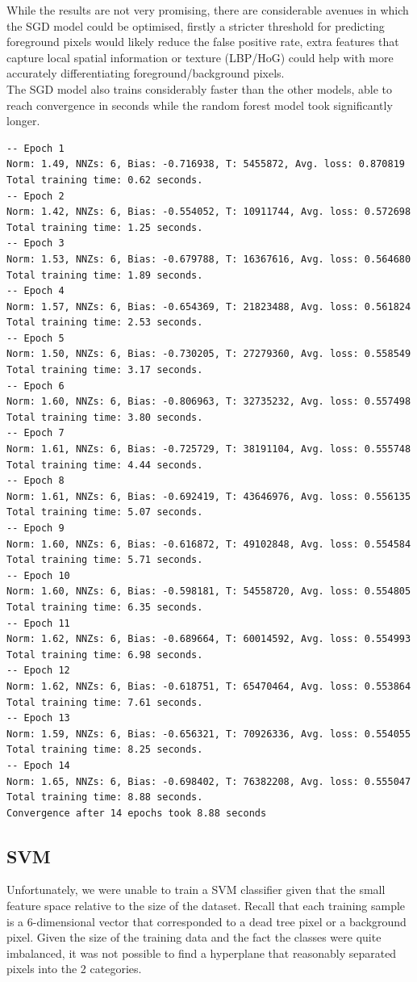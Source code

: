 While the results are not very promising, there are considerable avenues in which the SGD model could be optimised, firstly a stricter threshold for predicting foreground pixels would likely reduce the false positive rate, extra features that capture local spatial information or texture (LBP/HoG) could help with more accurately differentiating foreground/background pixels.\\
The SGD model also trains considerably faster than the other models, able to reach convergence in seconds while the random forest model took significantly longer.
\begin{lstlisting}[caption={SGD Training}, label={fig:sgd-train}]
-- Epoch 1
Norm: 1.49, NNZs: 6, Bias: -0.716938, T: 5455872, Avg. loss: 0.870819
Total training time: 0.62 seconds.
-- Epoch 2
Norm: 1.42, NNZs: 6, Bias: -0.554052, T: 10911744, Avg. loss: 0.572698
Total training time: 1.25 seconds.
-- Epoch 3
Norm: 1.53, NNZs: 6, Bias: -0.679788, T: 16367616, Avg. loss: 0.564680
Total training time: 1.89 seconds.
-- Epoch 4
Norm: 1.57, NNZs: 6, Bias: -0.654369, T: 21823488, Avg. loss: 0.561824
Total training time: 2.53 seconds.
-- Epoch 5
Norm: 1.50, NNZs: 6, Bias: -0.730205, T: 27279360, Avg. loss: 0.558549
Total training time: 3.17 seconds.
-- Epoch 6
Norm: 1.60, NNZs: 6, Bias: -0.806963, T: 32735232, Avg. loss: 0.557498
Total training time: 3.80 seconds.
-- Epoch 7
Norm: 1.61, NNZs: 6, Bias: -0.725729, T: 38191104, Avg. loss: 0.555748
Total training time: 4.44 seconds.
-- Epoch 8
Norm: 1.61, NNZs: 6, Bias: -0.692419, T: 43646976, Avg. loss: 0.556135
Total training time: 5.07 seconds.
-- Epoch 9
Norm: 1.60, NNZs: 6, Bias: -0.616872, T: 49102848, Avg. loss: 0.554584
Total training time: 5.71 seconds.
-- Epoch 10
Norm: 1.60, NNZs: 6, Bias: -0.598181, T: 54558720, Avg. loss: 0.554805
Total training time: 6.35 seconds.
-- Epoch 11
Norm: 1.62, NNZs: 6, Bias: -0.689664, T: 60014592, Avg. loss: 0.554993
Total training time: 6.98 seconds.
-- Epoch 12
Norm: 1.62, NNZs: 6, Bias: -0.618751, T: 65470464, Avg. loss: 0.553864
Total training time: 7.61 seconds.
-- Epoch 13
Norm: 1.59, NNZs: 6, Bias: -0.656321, T: 70926336, Avg. loss: 0.554055
Total training time: 8.25 seconds.
-- Epoch 14
Norm: 1.65, NNZs: 6, Bias: -0.698402, T: 76382208, Avg. loss: 0.555047
Total training time: 8.88 seconds.
Convergence after 14 epochs took 8.88 seconds
\end{lstlisting}

\subsection{SVM}
Unfortunately, we were unable to train a SVM classifier given that the small feature space relative to the size of the dataset. Recall that each training sample is a 6-dimensional vector that corresponded to a dead tree pixel or a background pixel. Given the size of the training data and the fact the classes were quite imbalanced, it was not possible to find a hyperplane that reasonably separated pixels into the 2 categories.\\


